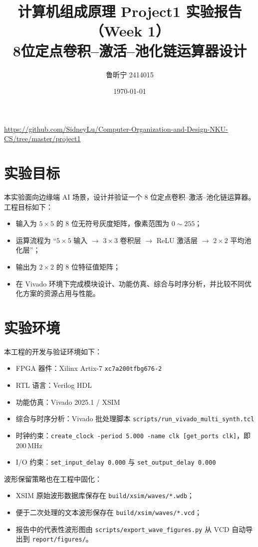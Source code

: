 \documentclass{article}
\title{计算机组成原理 Project1 实验报告（Week 1）\\8位定点卷积--激活--池化链运算器设计}
\author{鲁昕宁 2414015}
\date{\today}
\begin{document}
\maketitle
\begin{center}
  \url{https://github.com/SidneyLu/Computer-Organization-and-Design-NKU-CS/tree/master/project1}
\end{center}

\newpage

\section{实验目标}
本实验面向边缘端 AI 场景，设计并验证一个 8 位定点卷积--激活--池化链运算器。工程目标如下：
\begin{itemize}
  \item 输入为 $5\times 5$ 的 8 位无符号灰度矩阵，像素范围为 $0\sim255$；
  \item 运算流程为 ``$5\times 5$ 输入 $\rightarrow$ $3\times 3$ 卷积层 $\rightarrow$ ReLU 激活层 $\rightarrow$ $2\times 2$ 平均池化层''；
  \item 输出为 $2\times 2$ 的 8 位特征值矩阵；
  \item 在 Vivado 环境下完成模块设计、功能仿真、综合与时序分析，并比较不同优化方案的资源占用与性能。
\end{itemize}

\section{实验环境}
本工程的开发与验证环境如下：
\begin{itemize}
  \item FPGA 器件：Xilinx Artix-7 \texttt{xc7a200tfbg676-2}
  \item RTL 语言：Verilog HDL
  \item 功能仿真：Vivado 2025.1 / XSIM
  \item 综合与时序分析：Vivado 批处理脚本 \texttt{scripts/run\_vivado\_multi\_synth.tcl}
  \item 时钟约束：\texttt{create\_clock -period 5.000 -name clk [get\_ports clk]}，即 200\,MHz
  \item I/O 约束：\texttt{set\_input\_delay 0.000} 与 \texttt{set\_output\_delay 0.000}
\end{itemize}

波形保留策略也在工程中固化：
\begin{itemize}
  \item XSIM 原始波形数据库保存在 \verb|build/xsim/waves/*.wdb|；
  \item 便于二次处理的文本波形保存在 \verb|build/xsim/waves/*.vcd|；
  \item 报告中的代表性波形图由 \verb|scripts/export_wave_figures.py| 从 VCD 自动导出到 \verb|report/figures/|。
\end{itemize}
\end{document}
